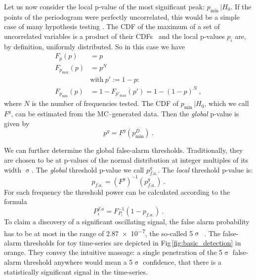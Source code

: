 
Let us now consider the local p-value of the most significant peak: $p_\text{min} \, | H_0$. If the points of the periodogram were perfectly uncorrelated, this would be a simple case of many hypothesis testing \cite{Algeri2016}. The CDF of the maximum of a set of uncorrelated variables is a product of their CDFs~\cite{Papoulis2002} and the local p-values $p_i$ are, by definition, uniformly distributed. So in this case we have
\begin{align}\label{eq:Fpmin}
  F_p(p) &= p \\
  F_{p_\text{max}}(p) &= p^N \\
  &\text{with}\ p' := 1 - p :\\
  F_{p_\text{min}}(p) &= 1 - F_{p'_\text{max}}(p') = 1 - (1 - p)^N \ ,
\end{align}
where $N$ is the number of frequencies tested.
The CDF of $p_\text{min} \, | H_0$, which we call $F^g$, can be estimated from the MC--generated data. Then the \emph{global} p-value is given by
\begin{equation}
  p^g = F^g(p_\text{min}^D) \ .
\end{equation}

We can further determine the global false-alarm thresholds. Traditionally, they are chosen to be at p-values of the normal distribution at integer multiples of its width $\upsigma$. The \emph{global} threshold p-value we call $p^g_{f.a.}$. The \emph{local} threshold p-value is:
\begin{equation}
  p_{f.a.} = \left( F^g \right)^{-1}(p^g_{f.a.}) \ .
\end{equation}
For each frequency the threshold power can be calculated according to the formula
\begin{equation}
  P^{f.a}_i = F_{P_i}^{-1}(1 - p_{f.a.}) \ .
\end{equation}
To claim a discovery of a significant oscillating signal, the false alarm probability has to be at most in the range of \num{2.87e-7}, the so-called 5$\upsigma$~\cite{PDG2016}. The false-alarm thresholds for toy time-series are depicted in Fig\,\ref{fig:basic_detection} in orange. They convey the intuitive massage: a single penetration of the 5$\upsigma$ false-alarm threshold anywhere would mean a 5$\upsigma$ confidence, that there is a statistically significant signal in the time-series.

